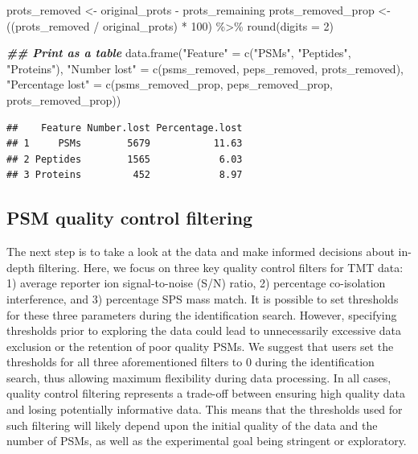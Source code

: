 \documentclass[9pt,a4paper,]{extarticle}
\newenvironment{Shaded}{\begin{snugshade}}{\end{snugshade}}
\newcommand{\AttributeTok}[1]{\textcolor[rgb]{0.77,0.63,0.00}{#1}}
\newcommand{\DecValTok}[1]{\textcolor[rgb]{0.00,0.00,0.81}{#1}}
\newcommand{\DocumentationTok}[1]{\textcolor[rgb]{0.56,0.35,0.01}{\textbf{\textit{#1}}}}
\newcommand{\FunctionTok}[1]{\textcolor[rgb]{0.00,0.00,0.00}{#1}}
\newcommand{\NormalTok}[1]{#1}
\newcommand{\OtherTok}[1]{\textcolor[rgb]{0.56,0.35,0.01}{#1}}
\newcommand{\SpecialCharTok}[1]{\textcolor[rgb]{0.00,0.00,0.00}{#1}}
\newcommand{\StringTok}[1]{\textcolor[rgb]{0.31,0.60,0.02}{#1}}
\begin{document}
\begin{Shaded}
\begin{Highlighting}[]
\NormalTok{prots\_removed }\OtherTok{\textless{}{-}}\NormalTok{ original\_prots }\SpecialCharTok{{-}}\NormalTok{ prots\_remaining}
\NormalTok{prots\_removed\_prop }\OtherTok{\textless{}{-}}\NormalTok{ ((prots\_removed }\SpecialCharTok{/}\NormalTok{ original\_prots) }\SpecialCharTok{*} \DecValTok{100}\NormalTok{) }\SpecialCharTok{\%\textgreater{}\%}
  \FunctionTok{round}\NormalTok{(}\AttributeTok{digits =} \DecValTok{2}\NormalTok{)}
\end{Highlighting}
\end{Shaded}

\begin{Shaded}
\begin{Highlighting}[]
\DocumentationTok{\#\# Print as a table}
\FunctionTok{data.frame}\NormalTok{(}\StringTok{"Feature"} \OtherTok{=} \FunctionTok{c}\NormalTok{(}\StringTok{"PSMs"}\NormalTok{,}
                         \StringTok{"Peptides"}\NormalTok{,}
                         \StringTok{"Proteins"}\NormalTok{),}
           \StringTok{"Number lost"} \OtherTok{=} \FunctionTok{c}\NormalTok{(psms\_removed,}
\NormalTok{                             peps\_removed,}
\NormalTok{                             prots\_removed),}
           \StringTok{"Percentage lost"} \OtherTok{=} \FunctionTok{c}\NormalTok{(psms\_removed\_prop,}
\NormalTok{                                 peps\_removed\_prop,}
\NormalTok{                                 prots\_removed\_prop))}
\end{Highlighting}
\end{Shaded}

\begin{verbatim}
##    Feature Number.lost Percentage.lost
## 1     PSMs        5679           11.63
## 2 Peptides        1565            6.03
## 3 Proteins         452            8.97
\end{verbatim}

\hypertarget{psm-quality-control-filtering}{%
\subsection{PSM quality control filtering}\label{psm-quality-control-filtering}}

The next step is to take a look at the data and make informed decisions about
in-depth filtering. Here, we focus on three key quality control filters for TMT
data: 1) average reporter ion signal-to-noise (S/N) ratio, 2) percentage
co-isolation interference, and 3) percentage SPS mass match. It is possible to
set thresholds for these three parameters during the identification search.
However, specifying thresholds prior to exploring the data could lead to
unnecessarily excessive data exclusion or the retention of poor quality PSMs. We
suggest that users set the thresholds for all three aforementioned filters to 0
during the identification search, thus allowing maximum flexibility during data
processing. In all cases, quality control filtering represents a trade-off
between ensuring high quality data and losing potentially informative data. This
means that the thresholds used for such filtering will likely depend upon the
initial quality of the data and the number of PSMs, as well as the experimental
goal being stringent or exploratory.
\end{document}
